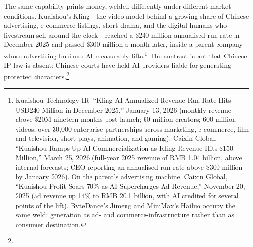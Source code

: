 The same capability prints money, welded differently under different market conditions. Kuaishou's Kling---the video model behind a growing share of Chinese advertising, e-commerce listings, short drama, and the digital humans who livestream-sell around the clock---reached a \$240 million annualised run rate in December 2025 and passed \$300 million a month later, inside a parent company whose advertising business AI measurably lifts.\footnote{Kuaishou Technology IR, ``Kling AI Annualized Revenue Run Rate Hits USD240 Million in December 2025,'' January 13, 2026 (monthly revenue above \$20M nineteen months post-launch; 60 million creators; 600 million videos; over 30,000 enterprise partnerships across marketing, e-commerce, film and television, short plays, animation, and gaming). Caixin Global, ``Kuaishou Ramps Up AI Commercialization as Kling Revenue Hits \$150 Million,'' March 25, 2026 (full-year 2025 revenue of RMB 1.04 billion, above internal forecasts; CEO reporting an annualised run rate above \$300 million by January 2026). On the parent's advertising machine: Caixin Global, ``Kuaishou Profit Soars 70\% as AI Supercharges Ad Revenue,'' November 20, 2025 (ad revenue up 14\% to RMB 20.1 billion, with AI credited for several points of the lift). ByteDance's Jimeng and MiniMax's Hailuo occupy the same weld: generation as ad- and commerce-infrastructure rather than as consumer destination.} The contrast is not that Chinese IP law is absent; Chinese courts have held AI providers liable for generating protected characters.\footnote{%
}
